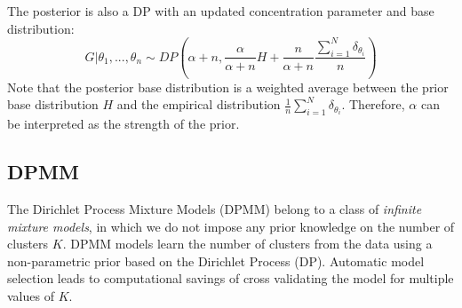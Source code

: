 The posterior is also a DP with an updated concentration parameter and base distribution:
\begin{equation}
    G|\theta_1,...,\theta_n \sim DP(\alpha+n, \frac{\alpha}{\alpha+n}H + \frac{n}{\alpha+n}\frac{\sum_{i=1}^{N}\delta_{\theta_i}}{n})
\end{equation}
Note that the posterior base distribution is a weighted average between the prior base distribution $H$ and the empirical distribution $\frac{1}{n}\sum_{i=1}^{N}\delta_{\theta_i}$. Therefore, $\alpha$ can be interpreted as the strength of the prior. 

\subsection{DPMM}

The Dirichlet Process Mixture Models (DPMM) belong to a class of \textit{infinite mixture models}, in which we do not impose any prior knowledge on the number of clusters $K$. DPMM models learn the number of clusters from the data using a non-parametric prior based on the Dirichlet Process (DP). Automatic model selection leads to computational savings of cross validating the model for multiple values of $K$.\\

